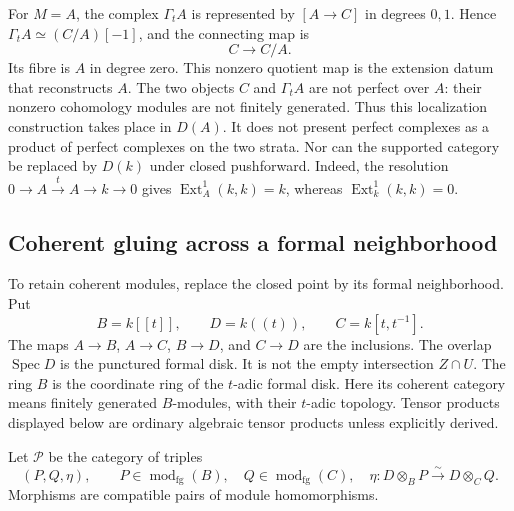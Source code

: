 For $M=A$, the complex $\Gamma_t A$ is represented by
$[A\to C]$ in degrees $0,1$.
Hence $\Gamma_t A\simeq(C/A)[-1]$, and the connecting map is
\[
 C\longrightarrow C/A.
\]
Its fibre is $A$ in degree zero. This nonzero quotient map is the
extension datum that reconstructs $A$.
The two objects $C$ and $\Gamma_t A$ are not perfect over $A$:
their nonzero cohomology modules are not finitely generated.
Thus this localization construction takes place in $D(A)$.
It does not present perfect complexes as a product of perfect
complexes on the two strata.
Nor can the supported category be replaced by $D(k)$ under closed
pushforward. Indeed, the resolution
$0\to A\xrightarrow{t}A\to k\to0$ gives
$\operatorname{Ext}^1_A(k,k)=k$, whereas
$\operatorname{Ext}^1_k(k,k)=0$.

\subsection{Coherent gluing across a formal neighborhood}

To retain coherent modules, replace the closed point by its formal
neighborhood. Put
\[
 B=k[[t]],\qquad D=k((t)),\qquad C=k[t,t^{-1}].
\]
The maps $A\to B$, $A\to C$, $B\to D$, and $C\to D$ are the
inclusions. The overlap $\operatorname{Spec}D$ is the punctured
formal disk. It is not the empty intersection $Z\cap U$.
The ring $B$ is the coordinate ring of the $t$-adic formal disk.
Here its coherent category means finitely generated $B$-modules,
with their $t$-adic topology. Tensor products displayed below are
ordinary algebraic tensor products unless explicitly derived.

Let $\mathcal P$ be the category of triples
\[
 (P,Q,\eta),\qquad P\in\operatorname{mod}_{\mathrm{fg}}(B),\quad
 Q\in\operatorname{mod}_{\mathrm{fg}}(C),\quad
 \eta:D\otimes_B P\xrightarrow{\sim}D\otimes_C Q.
\]
Morphisms are compatible pairs of module homomorphisms.

